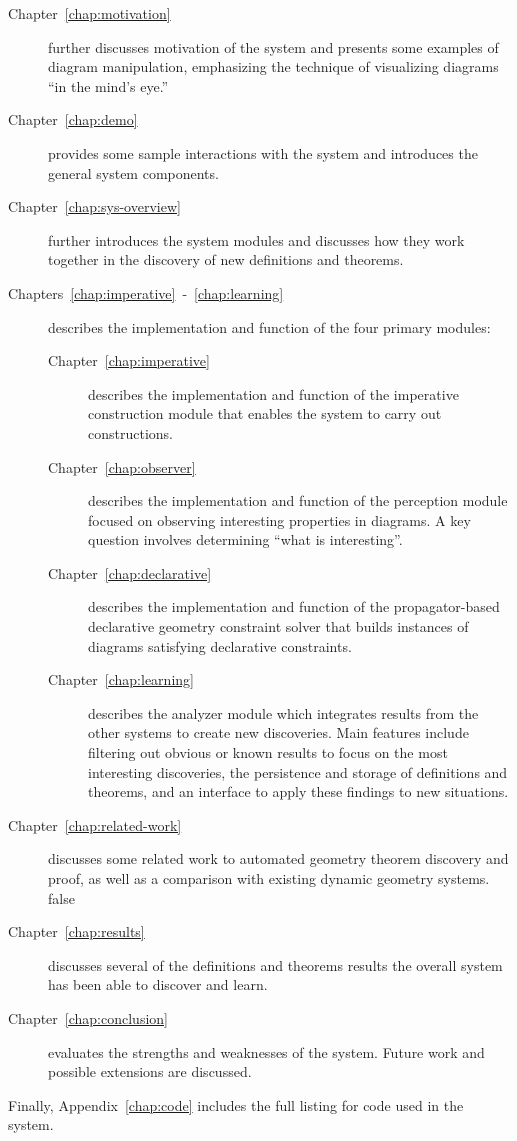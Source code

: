 \begin{description}

\item [Chapter~\ref{chap:motivation}] further discusses motivation of
  the system and presents some examples of diagram manipulation,
  emphasizing the technique of visualizing diagrams ``in the mind's
  eye.''

\item [Chapter~\ref{chap:demo}] provides some sample interactions with
  the system and introduces the general system components.

\item[Chapter~\ref{chap:sys-overview}] further introduces the system
  modules and discusses how they work together in the discovery of new
  definitions and theorems.

\item[Chapters~\ref{chap:imperative}~-~\ref{chap:learning}] describes
  the implementation and function of the four primary modules:

\begin{description}

\item[Chapter~\ref{chap:imperative}] describes the implementation
  and function of the imperative construction
  module that enables the system to carry out constructions.

\item[Chapter~\ref{chap:observer}] describes the implementation and
  function of the perception module focused on observing interesting
  properties in diagrams. A key question involves determining ``what
  is interesting''.

\item[Chapter~\ref{chap:declarative}] describes the implementation
  and function of the propagator-based declarative geometry constraint
  solver that builds instances of diagrams satisfying declarative
  constraints.

\item[Chapter~\ref{chap:learning}] describes the analyzer module which
  integrates results from the other systems to create new
  discoveries. Main features include filtering out obvious or known
  results to focus on the most interesting discoveries, the
  persistence and storage of definitions and theorems, and an
  interface to apply these findings to new situations.

\end{description}

\item[Chapter~\ref{chap:related-work}] discusses some related work to
  automated geometry theorem discovery and proof, as well as a
  comparison with existing dynamic geometry systems.
\if false
\item[Chapter~\ref{chap:results}] discusses several of the definitions
  and theorems results the overall system has been able to discover
  and learn.
\fi

\item[Chapter~\ref{chap:conclusion}] evaluates the strengths and
  weaknesses of the system. Future work and possible extensions are
  discussed.

\end{description}

Finally, Appendix~\ref{chap:code} includes the full listing for code
used in the system.
